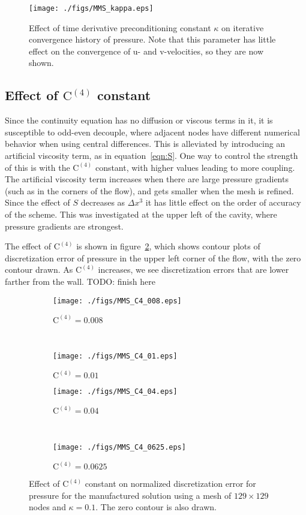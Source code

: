 \documentclass[10pt, letterpaper]{article}
\newcommand{\fig}[1]{figure~\ref{#1}}
\newcommand{\eqn}[1]{equation~\eqref{#1}}
\newcommand{\mesh}[1]{${#1} \times {#1}$}
\begin{document}
\begin{figure}[h]
	\centering
	\texttt{[image: ./figs/MMS\_kappa.eps]}
	\caption{Effect of time derivative preconditioning constant $\kappa$ on
		iterative convergence history of pressure.  Note that this parameter has
		little effect on the convergence of u- and v-velocities, so they 
		are now shown.}
	\label{fig:MMS_kappa}
\end{figure}


\subsection{Effect of $\mathrm{C^{(4)}}$ constant}

Since the continuity equation has no diffusion or viscous terms in it, it
is susceptible to odd-even decouple, where adjacent nodes have different numerical
behavior when using central differences.  This is alleviated by introducing
an artificial viscosity term, as in \eqn{eqn:S}.  One way to control the
strength of this is with the $\mathrm{C^{(4)}}$ constant, with higher values leading
to more coupling. The artificial viscosity term increases when there are large
pressure gradients (such as in the corners of the flow), and gets smaller when
the mesh is refined.  Since the effect of $S$ decreases as $\Delta x^3$ it has
little effect on the order of accuracy of the scheme.
This was investigated at the upper left of the cavity,
where pressure gradients are strongest.

The effect of $\mathrm{C^{(4)}}$ is shown in \fig{fig:MMS_C4}, which shows contour
plots of discretization error of pressure in the upper left corner of the flow, with
the zero contour drawn.  As $\mathrm{C^{(4)}}$ increases, we see discretization 
errors that are lower farther from the wall.  TODO: finish here

\begin{figure}
	\centering
	\begin{subfigure}[b]{0.475\textwidth}
		\centering
		\texttt{[image: ./figs/MMS\_C4\_008.eps]}
		\caption{$\mathrm{C^{(4)}} = 0.008$}
	\end{subfigure}
	~
	\begin{subfigure}[b]{0.475\textwidth}
		\centering
		\texttt{[image: ./figs/MMS\_C4\_01.eps]}
		\caption{$\mathrm{C^{(4)}} = 0.01$}
	\end{subfigure}
	
	\begin{subfigure}[b]{0.475\textwidth}
		\centering
		\texttt{[image: ./figs/MMS\_C4\_04.eps]}
		\caption{$\mathrm{C^{(4)}} = 0.04$}
	\end{subfigure}
	~
	\begin{subfigure}[b]{0.475\textwidth}
		\centering
		\texttt{[image: ./figs/MMS\_C4\_0625.eps]}
		\caption{$\mathrm{C^{(4)}} = 0.0625$}
	\end{subfigure}
	\caption{Effect of $\mathrm{C^{(4)}}$ constant on normalized discretization
		error for pressure for the manufactured solution using a mesh of
		\mesh{129} nodes and $\kappa = 0.1$.  The zero contour is also drawn.}
	\label{fig:MMS_C4}
\end{figure}
\end{document}
